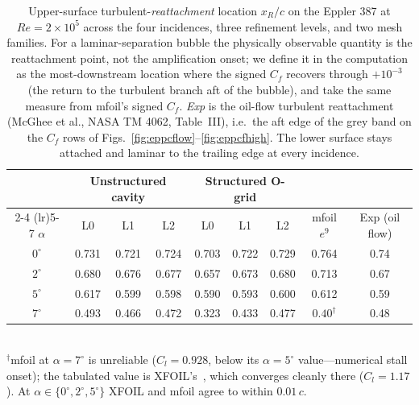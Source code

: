 \documentclass[journal]{new-aiaa}
\begin{document}
\begin{table}[tp]
  \centering
  \caption{Upper-surface turbulent-\emph{reattachment} location $x_R/c$ on the
  Eppler 387 at $Re\!=\!2\!\times\!10^5$ across the four incidences, three
  refinement levels, and two mesh families. For a laminar-separation bubble the
  physically observable quantity is the reattachment point, not the amplification
  onset; we define it in the computation as the most-downstream location where the
  signed $C_f$ recovers through $+10^{-3}$ (the return to the turbulent branch aft
  of the bubble), and take the same measure from mfoil's signed $C_f$. \emph{Exp}
  is the oil-flow turbulent reattachment (McGhee et al., NASA TM 4062, Table~III),
  i.e.\ the aft edge of the grey band on the $C_f$ rows of
  Figs.~\ref{fig:eppcflow}--\ref{fig:eppcfhigh}. The lower surface stays attached
  and laminar to the trailing edge at every incidence.}
  \label{tab:eppxtr}
  \begin{tabular}{ccccccccc}
    \toprule
    & \multicolumn{3}{c}{Unstructured cavity} & \multicolumn{3}{c}{Structured O-grid} & & \\
    \cmidrule(lr){2-4} \cmidrule(lr){5-7}
    $\alpha$ & L0 & L1 & L2 & L0 & L1 & L2 & mfoil $e^9$ & Exp (oil flow) \\
    \midrule
    $0^\circ$ & 0.731 & 0.721 & 0.724 & 0.703 & 0.722 & 0.729 & 0.764 & 0.74 \\
    $2^\circ$ & 0.680 & 0.676 & 0.677 & 0.657 & 0.673 & 0.680 & 0.713 & 0.67 \\
    $5^\circ$ & 0.617 & 0.599 & 0.598 & 0.590 & 0.593 & 0.600 & 0.612 & 0.59 \\
    $7^\circ$ & 0.493 & 0.466 & 0.472 & 0.323 & 0.433 & 0.477 & $0.40^\dagger$ & 0.48 \\
    \bottomrule
  \end{tabular}
  \\[2pt]{\footnotesize $^\dagger$mfoil at $\alpha\!=\!7^\circ$ is unreliable
  ($C_l\!=\!0.928$, below its $\alpha\!=\!5^\circ$ value---numerical stall onset);
  the tabulated value is XFOIL's~\cite{drela_xfoil_1989}, which converges cleanly
  there ($C_l\!=\!1.17$). At $\alpha\!\in\!\{0^\circ,2^\circ,5^\circ\}$ XFOIL and
  mfoil agree to within $0.01\,c$.}
\end{table}
\end{document}
